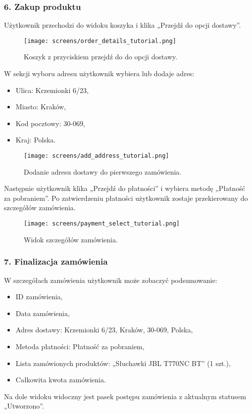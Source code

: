 \documentclass[12pt,a4paper,oneside]{article}
\theoremstyle{definition}
\numberwithin{equation}{section}
\begin{document}
\subsubsection*{\textbf{6. Zakup produktu}}
Użytkownik przechodzi do widoku koszyka i klika „Przejdź do opcji dostawy”. 
\begin{figure}[H]
    \centering
    \texttt{[image: screens/order\_details\_tutorial.png]}
    \caption{Koszyk z przyciskiem przejdź do do opcji dostawy.}
    \label{fig:order_details_first_tutorial}
\end{figure}
W sekcji wyboru adresu użytkownik wybiera lub dodaje adres:
\begin{itemize}
    \item Ulica: Krzemionki 6/23,
    \item Miasto: Kraków,
    \item Kod pocztowy: 30-069,
    \item Kraj: Polska.
\end{itemize}
\begin{figure}[H]
    \centering
    \texttt{[image: screens/add\_address\_tutorial.png]}
    \caption{Dodanie adresu dostawy do pierwszego zamówienia.}
    \label{fig:add_address_tutorial}
\end{figure}


Następnie użytkownik klika „Przejdź do płatności” i wybiera metodę „Płatność za pobraniem”. Po zatwierdzeniu płatności użytkownik zostaje przekierowany do szczegółów zamówienia.

\begin{figure}[H]
    \centering
    \texttt{[image: screens/payment\_select\_tutorial.png]}
    \caption{Widok szczegółów zamówienia.}
    \label{fig:order_details_tutorial}
\end{figure}

\subsubsection*{\textbf{7. Finalizacja zamówienia}}
W szczegółach zamówienia użytkownik może zobaczyć podsumowanie:
\begin{itemize}
    \item ID zamówienia,
    \item Data zamówienia,
    \item Adres dostawy: Krzemionki 6/23, Kraków, 30-069, Polska,
    \item Metoda płatności: Płatność za pobraniem,
    \item Lista zamówionych produktów: „Słuchawki JBL T770NC BT” (1 szt.),
    \item Całkowita kwota zamówienia.
\end{itemize}
Na dole widoku widoczny jest pasek postępu zamówienia z aktualnym statusem „Utworzono”.
\end{document}
